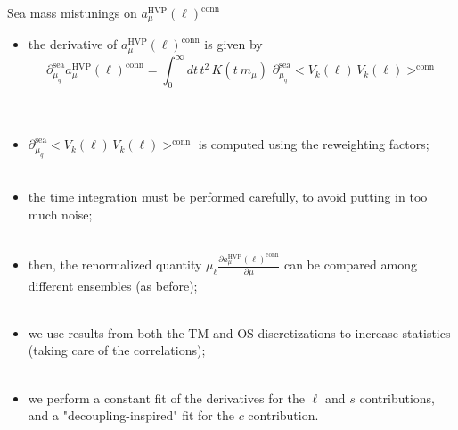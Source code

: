 \documentclass[xcolor={dvipsnames,table}]{beamer}
\begin{document}
\begin{frame}{Sea mass mistunings on $a_\mu^\mathrm{HVP}(\ell)^\mathrm{conn}$}
  \begin{itemize}
    \item the derivative of $a_\mu^\mathrm{HVP}(\ell)^\mathrm{conn}$ is given by
          \[
            \partial^\mathrm{sea}_{\mu_q}a_\mu^\mathrm{HVP}(\ell)^\mathrm{conn} = \int_0^\infty dt \, t^2 \, K(t\ m_\mu) \,\, \partial^\mathrm{sea}_{\mu_q}<V_k(\ell)\, V_k(\ell)>^\mathrm{conn}
          \]
          \\ \
    \item $\partial^\mathrm{sea}_{\mu_q}<V_k(\ell)\, V_k(\ell)>^\mathrm{conn}$ is computed using the reweighting factors;\\ \
    \item the time integration must be performed carefully, to avoid putting in too much noise;\\ \
    \item then, the renormalized quantity $\mu_\ell\frac{\partial a_\mu^\mathrm{HVP}(\ell)^\mathrm{conn}}{\partial \mu}$ can be compared among different ensembles (as before);\\ \
    \item we use results from both the TM and OS discretizations to increase statistics (taking care of the correlations);\\ \
    \item we perform a constant fit of the derivatives for the $\ell$ and $s$ contributions, and a "decoupling-inspired" fit for the $c$ contribution.
  \end{itemize}
\end{frame}
\end{document}
